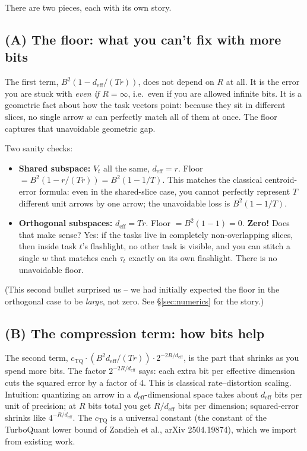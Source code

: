 \documentclass[11pt]{article}
\newcommand{\deff}{d_{\mathrm{eff}}}
\begin{document}
There are two pieces, each with its own story.

\subsection{(A) The floor: what you can't fix with more bits}

The first term, $B^2(1 - \deff/(Tr))$, does not depend on $R$ at all.
It is the error you are stuck with \emph{even if $R = \infty$}, i.e.\
even if you are allowed infinite bits. It is a geometric fact about
how the task vectors point: because they sit in different slices, no
single arrow $w$ can perfectly match all of them at once. The floor
captures that unavoidable geometric gap.

Two sanity checks:
\begin{itemize}[nosep]
  \item \textbf{Shared subspace:} $V_t$ all the same, $\deff = r$.
        Floor $= B^2(1 - r/(Tr)) = B^2(1 - 1/T)$. This matches the
        classical centroid-error formula: even in the shared-slice
        case, you cannot perfectly represent $T$ different unit arrows
        by one arrow; the unavoidable loss is $B^2(1 - 1/T)$.
  \item \textbf{Orthogonal subspaces:} $\deff = Tr$. Floor
        $= B^2(1 - 1) = 0$. \textbf{Zero!} Does that make sense? Yes:
        if the tasks live in completely non-overlapping slices, then
        inside task $t$'s flashlight, no other task is visible, and
        you can stitch a single $w$ that matches each $\tau_t$ exactly
        on its own flashlight. There is no unavoidable floor.
\end{itemize}
(This second bullet surprised us -- we had initially expected the
floor in the orthogonal case to be \emph{large}, not zero. See
\S\ref{sec:numerics} for the story.)

\subsection{(B) The compression term: how bits help}

The second term, $c_{\mathrm{TQ}}\cdot(B^2\deff/(Tr))\cdot 2^{-2R/\deff}$,
is the part that shrinks as you spend more bits. The factor $2^{-2R/\deff}$
says: each extra bit per effective dimension cuts the squared error by
a factor of 4. This is classical rate--distortion scaling. Intuition:
quantizing an arrow in a $\deff$-dimensional space takes about $\deff$
bits per unit of precision; at $R$ bits total you get $R/\deff$ bits
per dimension; squared-error shrinks like $4^{-R/\deff}$. The
$c_{\mathrm{TQ}}$ is a universal constant (the constant of the
TurboQuant lower bound of Zandieh et al., arXiv 2504.19874), which we
import from existing work.
\end{document}
